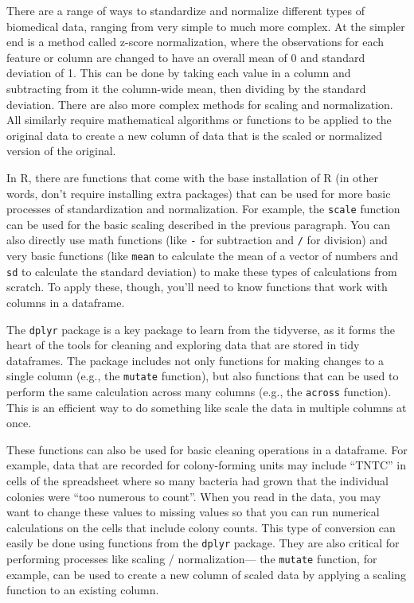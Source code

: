 \documentclass[]{tufte-book}
\begin{document}
There are a range of ways to standardize and normalize different types of
biomedical data, ranging from very simple to much more complex. At the simpler
end is a method called z-score normalization, where the observations for each
feature or column are changed to have an overall mean of 0 and standard
deviation of 1. This can be done by taking each value in a column and
subtracting from it the column-wide mean, then dividing by the standard
deviation. There are also more complex methods for scaling and normalization.
All similarly require mathematical algorithms or functions to be applied to the
original data to create a new column of data that is the scaled or normalized
version of the original.

In R, there are functions that come with the base installation of R (in other
words, don't require installing extra packages) that can be used for more basic
processes of standardization and normalization. For example, the \texttt{scale}
function can be used for the basic scaling described in the previous paragraph.
You can also directly use math functions (like \texttt{-} for subtraction and \texttt{/} for
division) and very basic functions (like \texttt{mean} to calculate the mean of a
vector of numbers and \texttt{sd} to calculate the standard deviation) to make these
types of calculations from scratch. To apply these, though, you'll need to know
functions that work with columns in a dataframe.

The \texttt{dplyr} package is a key package to learn from the tidyverse, as it forms
the heart of the tools for cleaning and exploring data that are stored in tidy
dataframes. The package includes not only functions for making changes to a
single column (e.g., the \texttt{mutate} function), but also functions that can be used
to perform the same calculation across many columns (e.g., the \texttt{across}
function). This is an efficient way to do something like scale the data in
multiple columns at once.

These functions can also be used for basic cleaning operations in a dataframe.
For example, data that are recorded for colony-forming units may include ``TNTC''
in cells of the spreadsheet where so many bacteria had grown that the individual
colonies were ``too numerous to count''. When you read in the data, you may want
to change these values to missing values so that you can run numerical
calculations on the cells that include colony counts. This type of conversion
can easily be done using functions from the \texttt{dplyr} package. They are also
critical for performing processes like scaling / normalization--- the \texttt{mutate}
function, for example, can be used to create a new column of scaled data by
applying a scaling function to an existing column.
\end{document}
